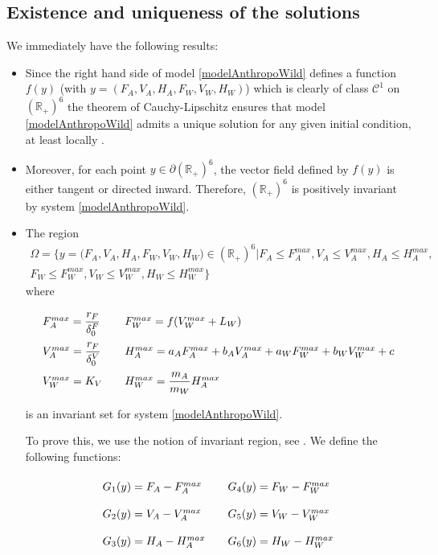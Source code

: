 \documentclass{article}
\newcommand{\df}{\delta_0^F}
\newcommand{\dv}{\delta_0^V}
\begin{document}
\subsection{Existence and uniqueness of the solutions}
We immediately have the following results:

\begin{itemize}
\item Since the right hand side of model \eqref{modelAnthropoWild} defines a function $f(y)$ (with $y = (F_A, V_A, H_A, F_W, V_W, H_W)$) which is clearly of class $\mathcal{C}^1$ on $(\mathbb{R}_+)^6$ the theorem of Cauchy-Lipschitz ensures that model \eqref{modelAnthropoWild} admits a unique solution for any given initial condition, at least locally \cite{walter_ordinary_1998}.
\item  Moreover, for each point $y \in \partial (\mathbb{R}_+)^6$, the vector field defined by $f(y)$ is either tangent or directed inward. Therefore, $(\mathbb{R}_+)^6$ is positively invariant by system \eqref{modelAnthropoWild}.
\item The region 
\begin{multline*}
\Omega = \Big\{ y = \Big(F_A, V_A, H_A, F_W, V_W, H_W \Big) \in (\mathbb{R}_+)^6  \Big| F_A \leq F_A^{max}, V_A \leq V_A^{max}, H_A \leq H_A^{max}, \\ F_W \leq F_W^{max}, V_W \leq V_W^{max}, H_W \leq H_W^{max} \Big\}
\end{multline*}
where
$$
\centering
\def\arraystretch{2}
\begin{array}{lll}
F_A^{max} = \dfrac{r_F}{\df} & & F_W^{max} = f(V_W^{max} + L_W)
\\
V_A^{max} = \dfrac{r_F}{\dv} & & H_A^{max} = a_A F_A^{max} + b_A V_A^{max} + a_W F_W^{max} + b_W V_W^{max} + c \\
V^{max}_W = K_V && H_W^{max} = \dfrac{m_A}{m_W} H^{max}_A
\end{array} 
$$

is an invariant set for system \eqref{modelAnthropoWild}.

To prove this, we use the notion of invariant region, see \cite{smoller_shock_1994}. We define the following functions:
$$
\centering
\def\arraystretch{2}
\begin{array}{lll}
G_1(y) = F_A - F_A^{max} & & G_4(y) = F_W - F_W^{max}
\\
G_2(y) = V_A - V_A^{max} & & G_5(y) = V_W - V_W^{max} \\
G_3(y) = H_A - H_A^{max} & & G_6(y) = H_W - H_W^{max} \\
\end{array} 
$$


\end{itemize}
\end{document}
